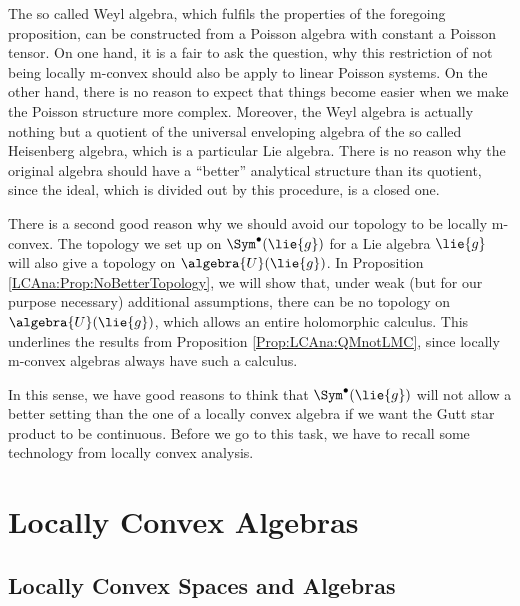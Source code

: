 \begin{remark}
	The so called Weyl algebra, which fulfils the properties of the 
	foregoing proposition, can be constructed from a Poisson algebra with 
	constant a Poisson tensor. On one hand, it is a fair to ask the question, 
	why this restriction of not being locally m-convex should also be apply to
	linear Poisson systems. On the other hand, there is no reason to 
	expect that things become easier when we make the Poisson structure more 
	complex. Moreover, the Weyl algebra is actually nothing but a 
	quotient of the universal enveloping algebra of the so called 
	Heisenberg algebra, which is a particular Lie algebra. There is 
	no reason why the original algebra should have a ``better'' analytical 
	structure than its quotient, since the ideal, which is divided out by 
	this procedure, is a closed one.
\end{remark}
There is a second good reason why we should avoid our topology to be locally 
m-convex. The topology we set up on $\Sym^{\bullet}(\lie{g})$ for a Lie 
algebra $\lie{g}$ will also give a topology on $\algebra{U}(\lie{g})$.
In Proposition \ref{LCAna:Prop:NoBetterTopology}, we will show that, under 
weak (but for our purpose necessary) additional assumptions, there can be no 
topology on $\algebra{U}(\lie{g})$, which allows an entire holomorphic 
calculus. This underlines the results from Proposition 
\ref{Prop:LCAna:QMnotLMC}, since locally m-convex algebras always have such a 
calculus.


In this sense, we have good reasons to think that 
$\Sym^{\bullet}(\lie{g})$ will not allow a better setting than the
one of a locally convex algebra if we want the Gutt star product to 
be continuous. Before we go to this task, we have to recall some
technology from locally convex analysis.



\section{Locally Convex Algebras}
\label{sec:chap5_LCAlg}

\subsection{Locally Convex Spaces and Algebras}

